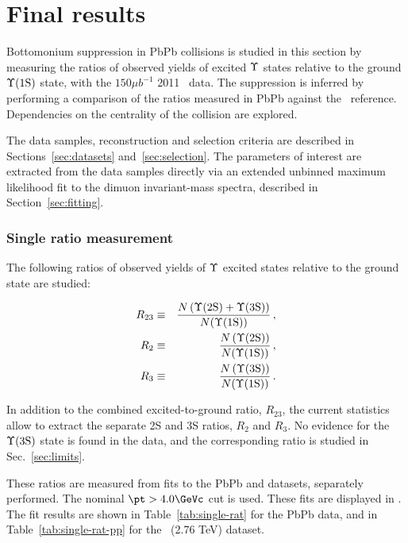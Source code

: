 \chapter{Final results}
Bottomonium suppression in PbPb collisions is studied in this section by measuring the ratios of observed yields of excited $\Upsilon$ states relative to the ground $\Upsilon\text{(1S)}$ state, with the $150 \mu b^{-1}$ 2011 \PbPb\ data. The suppression is inferred by performing a comparison of the ratios measured in PbPb against the \pp\ reference. Dependencies on the centrality of the  \PbPb collision are explored. 

The data samples,  reconstruction and selection criteria are described in Sections~\ref{sec:datasets} and~\ref{sec:selection}. 
%
The parameters of interest are extracted from the data samples directly via an extended unbinned maximum likelihood fit to the dimuon invariant-mass spectra, described in Section~\ref{sec:fitting}.


\subsection{Single ratio measurement}
\label{sec:singleratio}

The following ratios of observed yields of $\Upsilon$ excited states relative to the ground state are studied:
%
\begin{linenomath}
\begin{eqnarray}
\label{eqn:def:r23}
R_{23} & \equiv & \frac{N\left(\PgUb+\PgUc\right)}{N(\PgUa)} \,,\\
\label{eqn:def:r2}
R_{2}  & \equiv & \frac{N\left(\PgUb      \right)}{N(\PgUa)} \,, \\
\label{eqn:def:r3}
R_{3}  & \equiv & \frac{N\left(\PgUc      \right)}{N(\PgUa)} \,.
\end{eqnarray}
\end{linenomath}
%
In addition to the combined excited-to-ground ratio, $R_{23}$, the current statistics allow to extract the separate 2S and 3S ratios, $R_{2}$ and $R_3$. 
No evidence for the $\Upsilon\mathrm{(3S)}$ state is found in the \PbPb data, and the corresponding ratio is studied in Sec.~\ref{sec:limits}. 

These ratios are measured from fits to the PbPb and \Pp\Pp{} datasets, separately performed. 
The nominal $\pt>4.0 \GeVc$ cut is used.
These fits are displayed in .
The fit results are shown in Table~\ref{tab:single-rat} for the PbPb data, and in Table~\ref{tab:single-rat-pp} for the \pp\ (2.76 TeV) dataset. 

